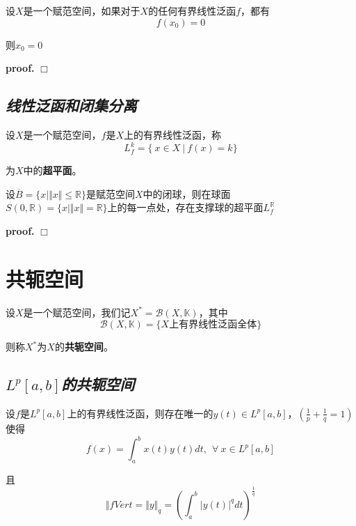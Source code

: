 \begin{mdframed}
    \begin{corollary}
       设$X$是一个赋范空间，如果对于$X$的任何有界线性泛函$f$，都有
       \begin{equation}
            f(x_0)=0
       \end{equation}

       则$x_0=0$
    \end{corollary}
\end{mdframed}
\textbf{proof.} $\Box$

\subsection*{\textsl{线性泛函和闭集分离}}

设$X$是一个赋范空间，$f$是$X$上的有界线性泛函，称
\begin{equation}
    L^k_f=\{\ x\in X\ | \ f(x)=k \}
\end{equation}

为$X$中的\textbf{超平面}。

\begin{mdframed}
    \begin{proposition}
        设$\overline{B}=\{x|\Vert x\Vert\leqslant \mathbb{R}\}$是赋范空间$X$中的闭球，则在球面\\$S(0,\mathbb{R})=\{x|\Vert x\Vert=\mathbb{R}\}$上的每一点处，存在支撑球的超平面$L^\mathbb{R}_f$
    \end{proposition}
\end{mdframed}
\textbf{proof.} $\Box$

\section{共轭空间}

设$X$是一个赋范空间，我们记$X^*=\mathcal{B}(X,\mathbb{K})$，其中
\begin{equation}
    \mathcal{B}(X,\mathbb{K})=\{X\mbox{上有界线性泛函全体}\}
\end{equation}

则称$X^*$为$X$的\textbf{共轭空间}。

\subsection*{$L^p[a,b]$\textsl{的共轭空间}}

\begin{mdframed}
    \begin{theorem}
        设$f$是$L^p[a,b]$上的有界线性泛函，则存在唯一的$y(t)\in L^p[a,b]$，$(\frac{1}{p}+\frac{1}{q}=1)$使得
        \begin{equation}
            f(x)=\int_{a}^{b}x(t)y(t)dt,\ \ \forall\ x\in L^p[a,b]
        \end{equation}

        且$$\Vert f Vert=\Vert y\Vert_q=\left(\int_{a}^{b}|y(t)|^qdt\right)^\frac{1}{q}$$
    \end{theorem}
\end{mdframed}

